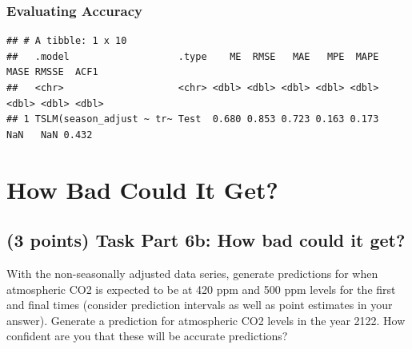 \documentclass[AER]{AEA}
\begin{document}
\hypertarget{evaluating-accuracy-1}{%
\subsubsection{Evaluating Accuracy}\label{evaluating-accuracy-1}}

\begin{verbatim}
## # A tibble: 1 x 10
##   .model                   .type    ME  RMSE   MAE   MPE  MAPE  MASE RMSSE  ACF1
##   <chr>                    <chr> <dbl> <dbl> <dbl> <dbl> <dbl> <dbl> <dbl> <dbl>
## 1 TSLM(season_adjust ~ tr~ Test  0.680 0.853 0.723 0.163 0.173   NaN   NaN 0.432
\end{verbatim}

\hypertarget{how-bad-could-it-get}{%
\section{How Bad Could It Get?}\label{how-bad-could-it-get}}

\hypertarget{points-task-part-6b-how-bad-could-it-get}{%
\subsection{(3 points) Task Part 6b: How bad could it
get?}\label{points-task-part-6b-how-bad-could-it-get}}

With the non-seasonally adjusted data series, generate predictions for
when atmospheric CO2 is expected to be at 420 ppm and 500 ppm levels for
the first and final times (consider prediction intervals as well as
point estimates in your answer). Generate a prediction for atmospheric
CO2 levels in the year 2122. How confident are you that these will be
accurate predictions?
\end{document}
